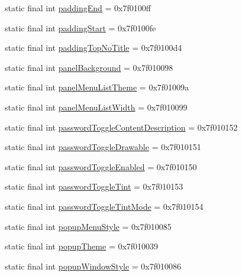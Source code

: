 \begin{CompactItemize}
static final int \hyperlink{classandroid_1_1support_1_1v7_1_1palette_1_1_r_1_1attr_a2d804e074f548e2e57d200fa23506ba}{paddingEnd} = 0x7f0100ff
\item 
static final int \hyperlink{classandroid_1_1support_1_1v7_1_1palette_1_1_r_1_1attr_523fa8a4f548e177bff7159d5e68fca6}{paddingStart} = 0x7f0100fe
\item 
static final int \hyperlink{classandroid_1_1support_1_1v7_1_1palette_1_1_r_1_1attr_d7f5e9bb2d17e97b488e5b421110cfa5}{paddingTopNoTitle} = 0x7f0100d4
\item 
static final int \hyperlink{classandroid_1_1support_1_1v7_1_1palette_1_1_r_1_1attr_451d83354f4f220b41779e9f754918d3}{panelBackground} = 0x7f010098
\item 
static final int \hyperlink{classandroid_1_1support_1_1v7_1_1palette_1_1_r_1_1attr_06f5b15d71d29f540b139d5195837550}{panelMenuListTheme} = 0x7f01009a
\item 
static final int \hyperlink{classandroid_1_1support_1_1v7_1_1palette_1_1_r_1_1attr_fcb2d75fb21c33c1e1a32409796663cf}{panelMenuListWidth} = 0x7f010099
\item 
static final int \hyperlink{classandroid_1_1support_1_1v7_1_1palette_1_1_r_1_1attr_81ad5aac4a6bd86b8d4519dd085c7d3c}{passwordToggleContentDescription} = 0x7f010152
\item 
static final int \hyperlink{classandroid_1_1support_1_1v7_1_1palette_1_1_r_1_1attr_9c468adab23cccb920461c58ec49d587}{passwordToggleDrawable} = 0x7f010151
\item 
static final int \hyperlink{classandroid_1_1support_1_1v7_1_1palette_1_1_r_1_1attr_ff73cc04594edf7dea8b027c95b710a9}{passwordToggleEnabled} = 0x7f010150
\item 
static final int \hyperlink{classandroid_1_1support_1_1v7_1_1palette_1_1_r_1_1attr_f3147a0846431af43cae7dd3dd567dd3}{passwordToggleTint} = 0x7f010153
\item 
static final int \hyperlink{classandroid_1_1support_1_1v7_1_1palette_1_1_r_1_1attr_fa18d7d4842a11799e0ebfb33901a856}{passwordToggleTintMode} = 0x7f010154
\item 
static final int \hyperlink{classandroid_1_1support_1_1v7_1_1palette_1_1_r_1_1attr_72263a897690bde19e41d01ee427a4c7}{popupMenuStyle} = 0x7f010085
\item 
static final int \hyperlink{classandroid_1_1support_1_1v7_1_1palette_1_1_r_1_1attr_c0a024405af51725edd3bf49b2b56c13}{popupTheme} = 0x7f010039
\item 
static final int \hyperlink{classandroid_1_1support_1_1v7_1_1palette_1_1_r_1_1attr_403aef963c28e36bec27990287ebeaa8}{popupWindowStyle} = 0x7f010086

\end{CompactItemize}
